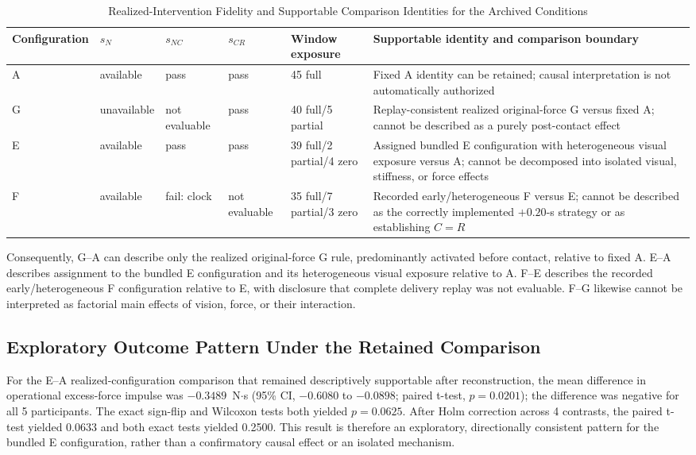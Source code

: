 \documentclass[journal]{IEEEtran}
\begin{document}
\begin{table}[t]
\caption{Realized-Intervention Fidelity and Supportable Comparison Identities for the Archived Conditions}
\label{tab:comparison_identity}
\centering
\scriptsize
\begin{tabularx}{\textwidth}{@{}p{}p{}p{}p{}p{}Y@{}}
\toprule
Configuration & $s_N$ & $s_{NC}$ & $s_{CR}$ & Window exposure & Supportable identity and comparison boundary \\
\midrule
A & available & pass & pass & 45 full & Fixed A identity can be retained; causal interpretation is not automatically authorized \\
G & unavailable & not evaluable & pass & 40 full/5 partial & Replay-consistent realized original-force G versus fixed A; cannot be described as a purely post-contact effect \\
E & available & pass & pass & 39 full/2 partial/4 zero & Assigned bundled E configuration with heterogeneous visual exposure versus A; cannot be decomposed into isolated visual, stiffness, or force effects \\
F & available & fail: clock & not evaluable & 35 full/7 partial/3 zero & Recorded early/heterogeneous F versus E; cannot be described as the correctly implemented $+0.20$-s strategy or as establishing $C=R$ \\
\bottomrule
\end{tabularx}
\end{table}

Consequently, G--A can describe only the realized original-force G rule,
predominantly activated before contact, relative to fixed A. E--A describes
assignment to the bundled E configuration and its heterogeneous visual
exposure relative to A. F--E describes the recorded early/heterogeneous F
configuration relative to E, with disclosure that complete delivery replay
was not evaluable. F--G likewise cannot be interpreted as factorial main
effects of vision, force, or their interaction.

\subsection{Exploratory Outcome Pattern Under the Retained Comparison}

For the E--A realized-configuration comparison that remained descriptively
supportable after reconstruction, the mean difference in operational
excess-force impulse was $-0.3489$~N$\cdot$s (95\% CI, $-0.6080$ to
$-0.0898$; paired t-test, $p=0.0201$); the difference was negative for all 5
participants. The exact sign-flip and Wilcoxon tests both yielded $p=0.0625$.
After Holm correction across 4 contrasts, the paired t-test yielded 0.0633 and
both exact tests yielded 0.2500. This result is therefore an exploratory,
directionally consistent pattern for the bundled E configuration, rather than
a confirmatory causal effect or an isolated mechanism.
\end{document}
